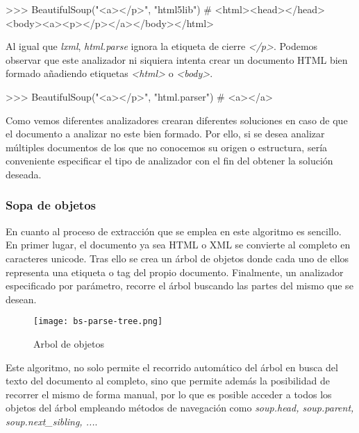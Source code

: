 \begin{Schunk}
  \begin{Soutput}
    >>> BeautifulSoup("<a></p>", "html5lib")
    # <html><head></head><body><a><p></p></a></body></html>
  \end{Soutput}
\end{Schunk}

Al igual que \emph{lxml}, \emph{html.parse} ignora la etiqueta de cierre \emph{</p>}. Podemos observar que 
este analizador ni siquiera intenta crear un documento HTML bien formado añadiendo etiquetas \emph{<html>} 
o \emph{<body>}.

\begin{Schunk}
  \begin{Soutput}
    >>> BeautifulSoup("<a></p>", "html.parser")
    # <a></a>
  \end{Soutput}
\end{Schunk}

Como vemos diferentes analizadores crearan diferentes soluciones en caso de que el documento a analizar no 
este bien formado. Por ello, si se desea analizar múltiples documentos de los que no conocemos su origen o 
estructura, sería conveniente especificar el tipo de analizador con el fin del obtener la solución deseada.

\subsubsection{Sopa de objetos}
\label{subsubsec:sopa de objetos}

En cuanto al proceso de extracción que se emplea en este algoritmo es sencillo. En primer lugar, el 
documento ya sea HTML o XML se convierte al completo en caracteres unicode. Tras ello se crea un árbol de 
objetos donde cada uno de ellos representa una etiqueta o tag del propio documento. Finalmente, un 
analizador especificado por parámetro, recorre el árbol buscando las partes del mismo que se desean.

\begin{figure}[tphb]
  \centering
  \texttt{[image: bs-parse-tree.png]}
  \caption{Arbol de objetos}
  \label{img:arbol de objetos}
\end{figure}

Este algoritmo, no solo permite el recorrido automático del árbol en busca del texto del documento al
completo, sino que permite además la posibilidad de recorrer el mismo de forma manual, por lo que es posible
acceder a todos los objetos del árbol empleando métodos de navegación como \emph{soup.head, soup.parent,
soup.next\_sibling, ...}.

